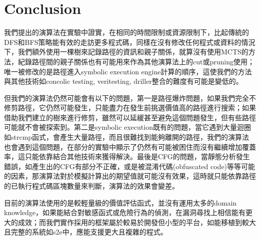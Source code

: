 \documentclass[12pt,a4paper,oneside]{book}
\begin{document}
\chapter{Conclusion}

我們提出的演算法在實驗中證實，在相同的時間限制或資源限制下，比起傳統的DFS和BFS策略能有效的走訪更多程式碼，同樣在沒有修改任何程式或資料的情況下，我們額外使用一棵樹來記錄路徑的資訊和親子關係，就算沒有使用MCTS的方法，紀錄路徑間的親子關係也有可能用來作為其他演算法上的cut或pruning使用；唯一被修改的是路徑進入symbolic execution engine計算的順序，這使我們的方法與其他技術如concolic testing\cite{sen2007concolic}, veritesting\cite{Veritesting}, driller\cite{stephens2016driller}整合的難度有可能是變低的。

但我們的演算法仍然可能會有以下的問題，第一是路徑爆炸問題，如果我們完全不修剪路徑，它仍然可能發生，只能盡力在發生前挑選價值高的路徑進行搜索；如果借助我們建立的樹來進行修剪，雖然可以延緩甚至避免這個問題發生，但有些路徑可能就不會被探索到。第二是symbolic execution既有的問題，當它遇到大量迴圈如strcmp函式，會產生大量路徑，而且很難找到能夠離開的路徑，我們的演算法也會遇到這個問題，在部分的實驗中顯示了仍然有可能被困住而沒有繼續增加覆蓋率，這只能依靠結合其他技術來獲得解決。最後是CFG的問題，當靜態分析發生錯誤，如產生出的CFG有部分不正確，或是被混淆代碼(obfuscated code)等等可能的因素，那演算法對於模擬計算出的期望值就可能沒有效果，這時就只能依靠路徑的已執行程式碼區塊數量來判斷，演算法的效果會變差。

目前的演算法使用的是較輕量級的價值評估函式，並沒有運用太多的domain knowledge，如果能結合對敏感函式或危險行為的偵測，在漏洞尋找上相信能有更大的成效；而我們實作採用的框架屬於較易於開發但小型的平台，如能移植到較大且完整的系統如s2e中，應能支援更大且複雜的程式。

\newpage

\printbibliography[title={References}]

\newpage
\end{document}
